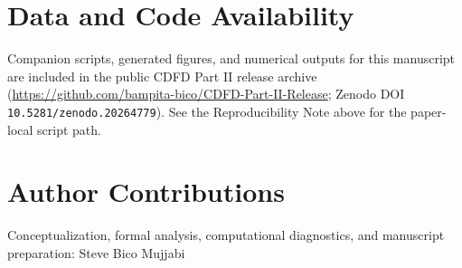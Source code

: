 \documentclass[11pt,a4paper]{article}
\begin{document}
\section*{Data and Code Availability}
Companion scripts, generated figures, and numerical outputs for this manuscript are included in the public CDFD Part II release archive (\url{https://github.com/bampita-bico/CDFD-Part-II-Release}; Zenodo DOI \texttt{10.5281/zenodo.20264779}). See the Reproducibility Note above for the paper-local script path.

\section*{Author Contributions}
Conceptualization, formal analysis, computational diagnostics, and manuscript preparation: Steve Bico Mujjabi



\end{document}

